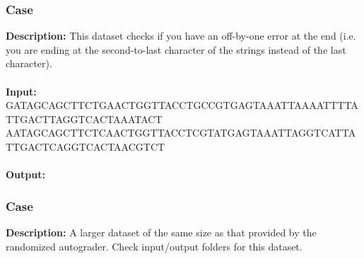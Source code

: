 \documentclass{article}
\newcommand{\code}[1]{{\fontfamily{pcr}\selectfont #1}}
\begin{document}
\subsubsection*{Case }
\hline \vspace{5}
\textbf{Description:} This dataset checks if you have an off-by-one error at the end (i.e. you are ending at the
second-to-last character of the strings instead of the last character).\\ \\
\noindent \textbf{Input:}\\
\code{GATAGCAGCTTCTGAACTGGTTACCTGCCGTGAGTAAATTAAAATTTTATTGACTTAGGTCACTAAATACT\\AATAGCAGCTTCTCAACTGGTTACCTCGTATGAGTAAATTAGGTCATTATTGACTCAGGTCACTAACGTCT}\\ \\
\noindent \textbf{Output:}\\
\code{28}

\subsubsection*{Case }
\hline \vspace{5}
\textbf{Description:} A larger dataset of the same size as that provided by the randomized autograder. Check input/output folders for this dataset.\\ \\
\pagebreak
\end{document}

